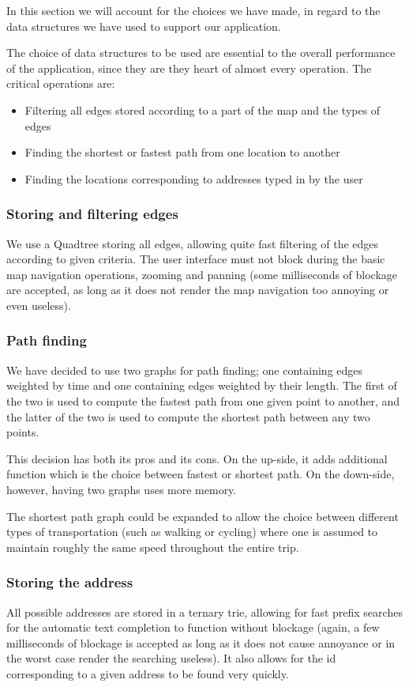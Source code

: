In this section we will account for the choices we have made, in regard to the data structures we have used to support our application.

The choice of data structures to be used are essential to the overall performance of the application, since they are they heart of almost every operation. The critical operations are:
\begin{itemize}
	\item Filtering all edges stored according to a part of the map and the types of edges
	\item Finding the shortest or fastest path from one location to another
	\item Finding the locations corresponding to addresses typed in by the user
\end{itemize}

\subsubsection{Storing and filtering edges}
We use a Quadtree storing all edges, allowing quite fast filtering of the edges according to given criteria. The user interface must not block during the basic map navigation operations, zooming and panning (some milliseconds of blockage are accepted, as long as it does not render the map navigation too annoying or even useless).

\subsubsection{Path finding}
We have decided to use two graphs for path finding; one containing edges weighted by time and one containing edges weighted by their length. The first of the two is used to compute the fastest path from one given point to another, and the latter of the two is used to compute the shortest path between any two points.

This decision has both its pros and its cons. On the up-side, it adds additional function which is the choice between fastest or shortest path. On the down-side, however, having two graphs uses more memory.

The shortest path graph could be expanded to allow the choice between different types of transportation (such as walking or cycling) where one is assumed to maintain roughly the same speed throughout the entire trip.

\subsubsection{Storing the address}
All possible addresses are stored in a ternary trie, allowing for fast prefix searches for the automatic text completion to function without blockage (again, a few milliseconds of blockage is accepted as long as it does not cause annoyance or in the worst case render the searching useless). It also allows for the id corresponding to a given address to be found very quickly.

